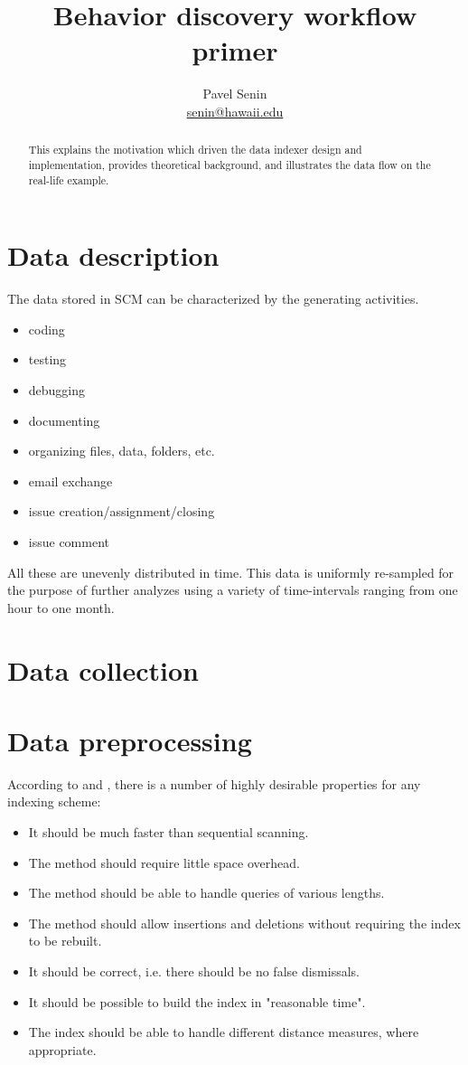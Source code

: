 \documentclass[10pt]{article}
\title{Behavior discovery workflow primer}
\author{Pavel Senin \\ \href{mailto:senin@hawaii.edu}{senin@hawaii.edu}}
\begin{document}
\maketitle

\begin{abstract}
This explains the motivation which driven the data indexer design and implementation, provides theoretical background, and 
illustrates the data flow on the real-life example.
\end{abstract}

\section{Data description}
The data stored in SCM can be characterized by the generating activities. 
\begin{itemize}
 \item coding
 \item testing
 \item debugging
 \item documenting
 \item organizing files, data, folders, etc.
 \item email exchange
 \item issue creation/assignment/closing
 \item issue comment
\end{itemize}
All these are unevenly distributed in time. This data is uniformly re-sampled 
for the purpose of further analyzes using a variety of time-intervals ranging from
one hour to one month.

\section{Data collection}

\section{Data preprocessing}
According to \cite{citeulike:825581} and \cite{citeulike:3000416}, there is a number of highly desirable 
properties for any indexing scheme:
\begin{itemize}
 \item It should be much faster than sequential scanning.
 \item The method should require little space overhead.
 \item The method should be able to handle queries of various lengths.
 \item The method should allow insertions and deletions without requiring the index to be rebuilt.
 \item It should be correct, i.e. there should be no false dismissals.
 \item It should be possible to build the index in "reasonable time".
 \item The index should be able to handle different distance measures, where appropriate.
\end{itemize}
\end{document}
